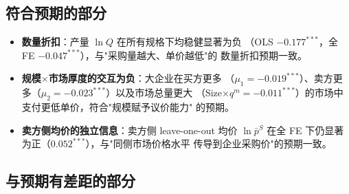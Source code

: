 \documentclass[12pt]{article}
\begin{document}
\subsection*{符合预期的部分}

\begin{itemize}[nosep]
  \item \textbf{数量折扣}：产量 $\ln Q$ 在所有规格下均稳健显著为负
    （OLS $-0.177^{***}$，全 FE $-0.047^{***}$），与"采购量越大、单价越低"的
    数量折扣预期一致。
  \item \textbf{规模$\times$市场厚度的交互为负}：大企业在买方更多
    （$\mu_1=-0.019^{***}$）、卖方更多（$\mu_2=-0.023^{***}$）以及市场总量更大
    （Size$\times q^m=-0.011^{***}$）的市场中支付更低单价，符合"规模赋予议价能力"
    的预期。
  \item \textbf{卖方侧均价的独立信息}：卖方侧 leave-one-out 均价
    $\ln\bar{p}^{S}$ 在全 FE 下仍显著为正（$0.052^{***}$），与"同侧市场价格水平
    传导到企业采购价"的预期一致。
\end{itemize}

\subsection*{与预期有差距的部分}
\end{document}
